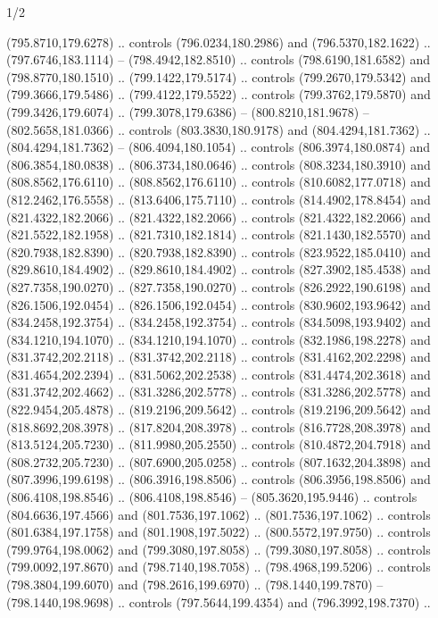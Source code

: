 \begin{flagdescription}{1/2}
\begin{scope}[xshift=0.75\flaglength,yshift=0.5\flagwidth,scale=0.00293\flagwidth]
\begin{scope}[scale=0.675,y=0.80pt, x=0.80pt,yscale=-1,xshift=-720,yshift=-240]
\begin{scope}[miter limit=4.80]
\begin{scope}[miter limit=3.00]
  (795.8710,179.6278) .. controls (796.0234,180.2986) and (796.5370,182.1622) ..
  (797.6746,183.1114) -- (798.4942,182.8510) .. controls (798.6190,181.6582) and
  (798.8770,180.1510) .. (799.1422,179.5174) .. controls (799.2670,179.5342) and
  (799.3666,179.5486) .. (799.4122,179.5522) .. controls (799.3762,179.5870) and
  (799.3426,179.6074) .. (799.3078,179.6386) -- (800.8210,181.9678) --
  (802.5658,181.0366) .. controls (803.3830,180.9178) and (804.4294,181.7362) ..
  (804.4294,181.7362) -- (806.4094,180.1054) .. controls (806.3974,180.0874) and
  (806.3854,180.0838) .. (806.3734,180.0646) .. controls (808.3234,180.3910) and
  (808.8562,176.6110) .. (808.8562,176.6110) .. controls (810.6082,177.0718) and
  (812.2462,176.5558) .. (813.6406,175.7110) .. controls (814.4902,178.8454) and
  (821.4322,182.2066) .. (821.4322,182.2066) .. controls (821.4322,182.2066) and
  (821.5522,182.1958) .. (821.7310,182.1814) .. controls (821.1430,182.5570) and
  (820.7938,182.8390) .. (820.7938,182.8390) .. controls (823.9522,185.0410) and
  (829.8610,184.4902) .. (829.8610,184.4902) .. controls (827.3902,185.4538) and
  (827.7358,190.0270) .. (827.7358,190.0270) .. controls (826.2922,190.6198) and
  (826.1506,192.0454) .. (826.1506,192.0454) .. controls (830.9602,193.9642) and
  (834.2458,192.3754) .. (834.2458,192.3754) .. controls (834.5098,193.9402) and
  (834.1210,194.1070) .. (834.1210,194.1070) .. controls (832.1986,198.2278) and
  (831.3742,202.2118) .. (831.3742,202.2118) .. controls (831.4162,202.2298) and
  (831.4654,202.2394) .. (831.5062,202.2538) .. controls (831.4474,202.3618) and
  (831.3742,202.4662) .. (831.3286,202.5778) .. controls (831.3286,202.5778) and
  (822.9454,205.4878) .. (819.2196,209.5642) .. controls (819.2196,209.5642) and
  (818.8692,208.3978) .. (817.8204,208.3978) .. controls (816.7728,208.3978) and
  (813.5124,205.7230) .. (811.9980,205.2550) .. controls (810.4872,204.7918) and
  (808.2732,205.7230) .. (807.6900,205.0258) .. controls (807.1632,204.3898) and
  (807.3996,199.6198) .. (806.3916,198.8506) .. controls (806.3956,198.8506) and
  (806.4108,198.8546) .. (806.4108,198.8546) -- (805.3620,195.9446) .. controls
  (804.6636,197.4566) and (801.7536,197.1062) .. (801.7536,197.1062) .. controls
  (801.6384,197.1758) and (801.1908,197.5022) .. (800.5572,197.9750) .. controls
  (799.9764,198.0062) and (799.3080,197.8058) .. (799.3080,197.8058) .. controls
  (799.0092,197.8670) and (798.7140,198.7058) .. (798.4968,199.5206) .. controls
  (798.3804,199.6070) and (798.2616,199.6970) .. (798.1440,199.7870) --
  (798.1440,198.9698) .. controls (797.5644,199.4354) and (796.3992,198.7370) ..

\end{scope}
\end{scope}
\end{scope}
\end{scope}
\end{flagdescription}
